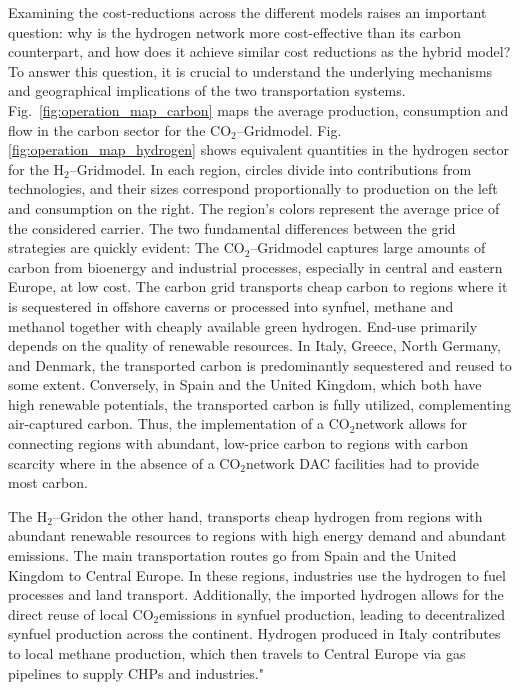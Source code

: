 \documentclass[twocolumn]{article}
\newcommand{\carbon}{CO$_2$}
\newcommand{\hydrogen}{H$_2$}
\newcommand{\hydrogengrid}{\hydrogen{}--Grid}
\newcommand{\carbongrid}{\carbon{}--Grid}
\begin{document}
Examining the cost-reductions across the different models raises an important question: why is the hydrogen network more cost-effective than its carbon counterpart, and how does it achieve similar cost reductions as the hybrid model? To answer this question, it is crucial to understand the underlying mechanisms and geographical implications of the two transportation systems. Fig.~\ref{fig:operation_map_carbon} maps the average production, consumption and flow in the carbon sector for the \carbongrid model. Fig. \ref{fig:operation_map_hydrogen} shows equivalent quantities in the hydrogen sector for the \hydrogengrid model. In each region, circles divide into contributions from technologies, and their sizes correspond proportionally to production on the left and consumption on the right. The region's colors represent the average price of the considered carrier.
The two fundamental differences between the grid strategies are quickly evident: The \carbongrid model captures large amounts of carbon from bioenergy and industrial processes, especially in central and eastern Europe, at low cost. The carbon grid transports cheap carbon to regions where it is sequestered in offshore caverns or processed into synfuel, methane and methanol together with cheaply available green hydrogen. End-use primarily depends on the quality of renewable resources. In Italy, Greece, North Germany, and Denmark, the transported carbon is predominantly sequestered and reused to some extent. Conversely, in Spain and the United Kingdom, which both have high renewable potentials, the transported carbon is fully utilized, complementing air-captured carbon. Thus, the implementation of a \carbon network allows for connecting regions with abundant, low-price carbon to regions with carbon scarcity where in the absence of a \carbon network DAC facilities had to provide most carbon.

The \hydrogengrid on the other hand, transports cheap hydrogen from regions with abundant renewable resources to regions with high energy demand and abundant emissions. The main transportation routes go from Spain and the United Kingdom to Central Europe. In these regions, industries use the hydrogen to fuel processes and land transport. Additionally, the imported hydrogen allows for the direct reuse of local \carbon emissions in synfuel production, leading to decentralized synfuel production across the continent. Hydrogen produced in Italy contributes to local methane production, which then travels to Central Europe via gas pipelines to supply CHPs and industries."
\end{document}
